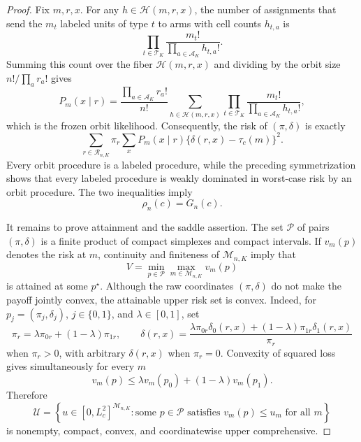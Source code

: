 \documentclass{article}
\begin{document}
\begin{proof}
Fix \(m,r,x\).  For any \(h\in\mathcal H(m,r,x)\), the number of assignments that send the \(m_t\) labeled units of type \(t\) to arms with cell counts \(h_{t,a}\) is
\[
 \prod_{t\in\mathcal T_K}\frac{m_t!}{\prod_{a\in\mathcal A_K}h_{t,a}!}.
\]
Summing this count over the fiber \(\mathcal H(m,r,x)\) and dividing by the orbit size \(n!/\prod_a r_a!\) gives
\[
 P_m(x\mid r)=\frac{\prod_{a\in\mathcal A_K}r_a!}{n!}
 \sum_{h\in\mathcal H(m,r,x)}
 \prod_{t\in\mathcal T_K}\frac{m_t!}{\prod_{a\in\mathcal A_K}h_{t,a}!},
\]
which is the frozen orbit likelihood.  Consequently, the risk of \((\pi,\delta)\) is exactly
\[
 \sum_{r\in\mathcal R_{n,K}}\pi_r
 \sum_xP_m(x\mid r)\{\delta(r,x)-\tau_c(m)\}^2.
\]
Every orbit procedure is a labeled procedure, while the preceding symmetrization shows that every labeled procedure is weakly dominated in worst-case risk by an orbit procedure.  The two inequalities imply
\[
 \rho_n(c)=G_n(c).
\]

It remains to prove attainment and the saddle assertion.  The set \(\mathscr P\) of pairs \((\pi,\delta)\) is a finite product of compact simplexes and compact intervals.  If \(v_m(p)\) denotes the risk at \(m\), continuity and finiteness of \(\mathcal M_{n,K}\) imply that
\[
 V=\min_{p\in\mathscr P}\max_{m\in\mathcal M_{n,K}}v_m(p)
\]
is attained at some \(p^\star\).  Although the raw coordinates \((\pi,\delta)\) do not make the payoff jointly convex, the attainable upper risk set is convex.  Indeed, for \(p_j=(\pi_j,\delta_j)\), \(j\in\{0,1\}\), and \(\lambda\in[0,1]\), set
\[
 \pi_r=\lambda\pi_{0r}+(1-\lambda)\pi_{1r},
 \qquad
 \delta(r,x)=
 \frac{\lambda\pi_{0r}\delta_0(r,x)+(1-\lambda)\pi_{1r}\delta_1(r,x)}{\pi_r}
\]
when \(\pi_r>0\), with arbitrary \(\delta(r,x)\) when \(\pi_r=0\).  Convexity of squared loss gives simultaneously for every \(m\)
\[
 v_m(p)\le\lambda v_m(p_0)+(1-\lambda)v_m(p_1).
\]
Therefore
\[
 \mathcal U=\left\{u\in[0,L_c^2]^{\mathcal M_{n,K}}:
 \text{some }p\in\mathscr P\text{ satisfies }v_m(p)\le u_m
 \text{ for all }m\right\}
\]
is nonempty, compact, convex, and coordinatewise upper comprehensive.


\end{proof}
\end{document}

